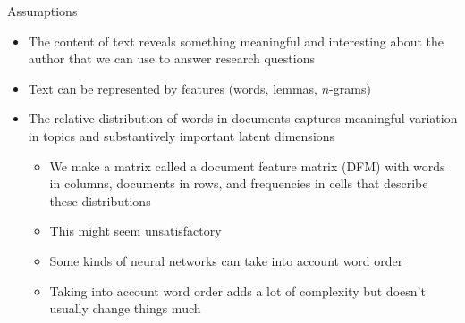 \documentclass[pdf, 9pt, fleqn, handout]{beamer}
\begin{document}
\begin{frame}{Assumptions}
\begin{itemize}
\item The content of text reveals something meaningful and interesting about the author that we can use to answer research questions \\[1em]
\item Text can be represented by features (words, lemmas, $n$-grams) \\[1em]
\item The relative distribution of words in documents captures meaningful variation in topics and substantively important latent dimensions \\[0.5em]
\begin{itemize}
\item We make a matrix called a document feature matrix (DFM) with words in columns, documents in rows, and frequencies in cells that describe these distributions \\[1em]
\item This might seem unsatisfactory \\[1em]
\item Some kinds of neural networks can take into account word order \\[1em]
\item Taking into account word order adds a lot of complexity but doesn't usually change things much
\end{itemize}
\end{itemize}
\end{frame}
\end{document}
